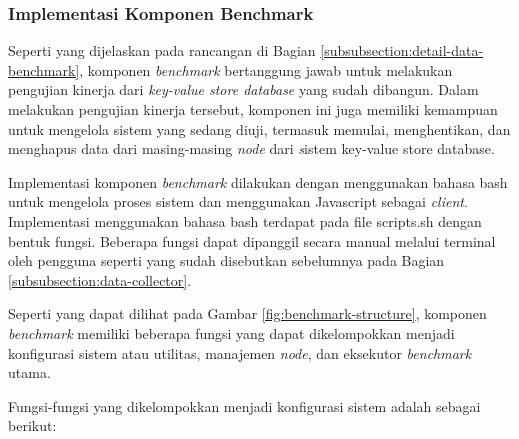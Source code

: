 \subsubsection{Implementasi Komponen Benchmark}
\label{subsubsection:implementasi-benchmark}

Seperti yang dijelaskan pada rancangan di Bagian \ref{subsubsection:detail-data-benchmark}, komponen \textit{benchmark} bertanggung jawab untuk melakukan pengujian kinerja dari \textit{key-value store database} yang sudah dibangun. Dalam melakukan pengujian kinerja tersebut, komponen ini juga memiliki kemampuan untuk mengelola sistem yang sedang diuji, termasuk memulai, menghentikan, dan menghapus data dari masing-masing \textit{node} dari \textit sistem {key-value store database}.

Implementasi komponen \textit{benchmark} dilakukan dengan menggunakan bahasa bash untuk mengelola proses sistem dan menggunakan Javascript sebagai \textit{client}. Implementasi menggunakan bahasa bash terdapat pada file scripts.sh dengan bentuk fungsi. Beberapa fungsi dapat dipanggil secara manual melalui terminal oleh pengguna seperti yang sudah disebutkan sebelumnya pada Bagian \ref{subsubsection:data-collector}.

Seperti yang dapat dilihat pada Gambar \ref{fig:benchmark-structure}, komponen \textit{benchmark} memiliki beberapa fungsi yang dapat dikelompokkan menjadi konfigurasi sistem atau utilitas, manajemen \textit{node}, dan eksekutor \textit{benchmark} utama.

Fungsi-fungsi yang dikelompokkan menjadi konfigurasi sistem adalah sebagai berikut:

